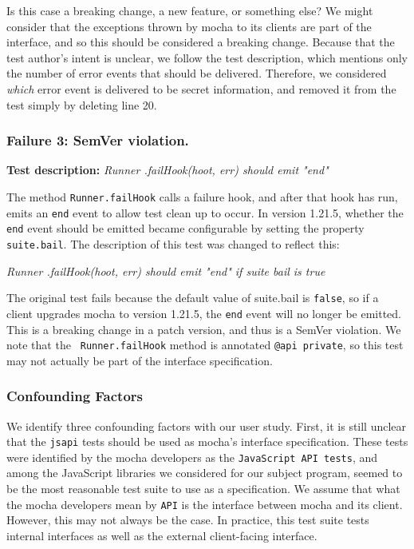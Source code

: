 Is this case a breaking change, a new feature, or something else?
We might consider that the exceptions thrown by mocha to its clients
are part of the interface, and so this should be considered a breaking
change. Because that the test author's intent is unclear, we follow the
test description, which mentions only the number of error events that
should be delivered. Therefore, we considered {\em which} error event
is delivered to be secret information, and removed it from the test
simply by deleting line 20.

\subsubsection{Failure 3: SemVer violation.}
\label{sec:failure3}
{\bf Test description:}
%
{\em Runner .failHook(hoot, err) should emit "end" }

The method {\tt Runner.failHook} calls a failure hook, and after that
hook has run, emits an {\tt end} event to allow test clean up to occur. In
version 1.21.5, whether the {\tt end} event should be emitted became
configurable by setting the property {\tt suite.bail}. The
description of this test was changed to reflect this:

{\em Runner .failHook(hoot, err) should emit "end" if suite bail is
  true }

The original test fails because the default value of suite.bail is
{\tt false}, so if a client upgrades mocha to version 1.21.5, the
{\tt end} event will no longer be emitted. This is a breaking change in
a patch version, and thus is a SemVer violation. We note that the {\tt
  Runner.failHook} method is annotated {\tt @api private}, so this test
may not actually be part of the interface specification.

\subsubsection{Confounding Factors}
We identify three confounding factors with our user study. First, it
is still unclear that the {\tt jsapi} tests should be used as mocha's
interface specification. These tests were identified by the mocha
developers as the {\tt JavaScript API tests}, and among the JavaScript
libraries we considered for our subject program, seemed to be the most
reasonable test suite to use as a specification. We assume that what
the mocha developers mean by {\tt API} is the interface between mocha and
its client. However, this may not always be the case. In practice, this
test suite tests internal interfaces as well as the external
client-facing interface.

